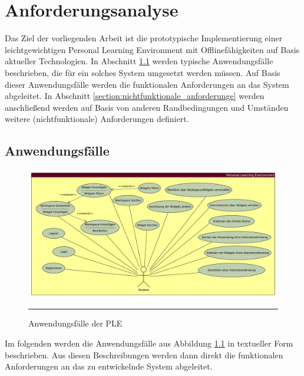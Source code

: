 \chapter{Anforderungsanalyse} 
\label{chapter:Kapitel3}

Das Ziel der vorliegenden Arbeit ist die prototypische Implementierung einer leichtgewichtigen Personal Learning Environment mit Offlinefähigkeiten auf Basis aktueller Technologien. In Abschnitt \ref{section:anwendungsfaelle} werden typische Anwendungsfälle beschrieben, die für ein solches System umgesetzt werden müssen. Auf Basis dieser Anwendungsfälle werden die funktionalen Anforderungen an das System abgeleitet. In Abschnitt \ref{section:nichtfunktionale_anforderunge} werden anschließend werden auf Basis von anderen Randbedingungen und Umständen weitere (nichtfunktionale) Anforderungen definiert.

\section{Anwendungsfälle}\label{section:anwendungsfaelle}
\begin{figure}[h]
  \centering
  \includegraphics[width=\textwidth,height=\textheight,keepaspectratio]{./Figures/anwendungsfaelle_quer.pdf}
    \rule{35em}{0.5pt}
  \caption[Die wichtigsten Anwendungsfälle für die prototypische Personal Learning EnvironmentAnwendungsfälle der PLE]{Anwendungsfälle der PLE}
  \label{fig:anwendungsfaelle}
\end{figure}

Im folgenden werden die Anwendungsfälle aus Abbildung \ref{fig:anwendungsfaelle} in textueller Form beschrieben. Aus diesen Beschreibungen werden dann direkt die funktionalen Anforderungen an das zu entwickelnde System abgeleitet.

